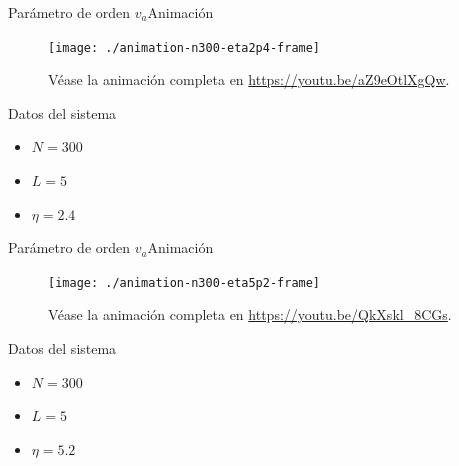 \documentclass{beamer}
\begin{document}
            \begin{frame}{Parámetro de orden $v_a$}{Animación}
                \begin{minipage}[t]{0.60\textwidth}
                    \begin{figure}[H!]
                        \texttt{[image: ./animation-n300-eta2p4-frame]}
                        \caption*{Véase la animación completa en \url{https://youtu.be/aZ9eOtlXgQw}.}
                        \label{fig:va_2}
                    \end{figure}
                \end{minipage}
                \hfill
                \begin{minipage}[t]{0.30\textwidth}
                    \begin{block}{Datos del sistema}
                        \begin{itemize}
                            \item $N=300$
                            \item $L=5$
                            \item $\eta=2.4$
                        \end{itemize}
                    \end{block}
                \end{minipage}
            \end{frame}

            \begin{frame}{Parámetro de orden $v_a$}{Animación}
                \begin{minipage}[t]{0.60\textwidth}
                    \begin{figure}[H!]
                        \texttt{[image: ./animation-n300-eta5p2-frame]}
                        \caption*{Véase la animación completa en \url{https://youtu.be/QkXskl_8CGs}.}
                        \label{fig:va_3}
                    \end{figure}
                \end{minipage}
                \hfill
                \begin{minipage}[t]{0.30\textwidth}
                    \begin{block}{Datos del sistema}
                        \begin{itemize}
                            \item $N=300$
                            \item $L=5$
                            \item $\eta=5.2$
                        \end{itemize}
                    \end{block}
                \end{minipage}
            \end{frame}
\end{document}
